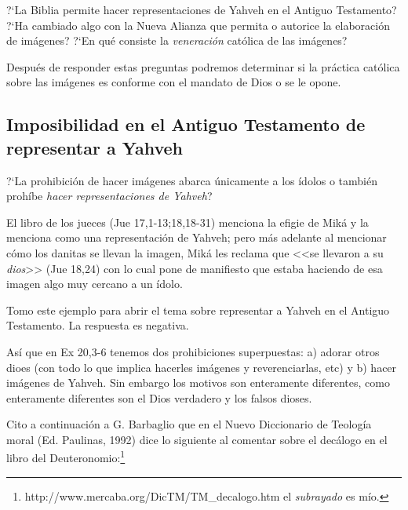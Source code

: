 ?`La Biblia permite hacer representaciones de Yahveh en el Antiguo Testamento? ?`Ha cambiado algo con la Nueva Alianza que permita o autorice la elaboraci\'on de im\'agenes? ?`En qu\'e consiste la \emph{veneraci\'on} cat\'olica de las im\'agenes?

Despu\'es de responder estas preguntas podremos determinar si la pr\'actica cat\'olica sobre las im\'agenes es conforme con el mandato de Dios o se le opone.

\subsection{Imposibilidad en el Antiguo Testamento de representar a Yahveh}

?`La prohibici\'on de hacer im\'agenes abarca \'unicamente a los \'{i}dolos o tambi\'en proh\'{i}be \emph{hacer representaciones de Yahveh}?

El libro de los jueces (Jue 17,1-13;18,18-31) menciona la efigie de Mik\'a y la menciona como una representaci\'on de Yahveh; pero m\'as adelante al mencionar c\'omo los danitas se llevan la imagen, Mik\'a les reclama que <<se llevaron a su \emph{dios}>> (Jue 18,24) con lo cual pone de manifiesto que estaba haciendo de esa imagen algo muy cercano a un \'{i}dolo.

Tomo este ejemplo para abrir el tema sobre representar a Yahveh en el Antiguo Testamento. La respuesta es negativa.

As\'{i} que en Ex 20,3-6 tenemos dos prohibiciones superpuestas: a) adorar otros dioes (con todo lo que implica hacerles im\'agenes y reverenciarlas, etc) y b) hacer im\'agenes de Yahveh. Sin embargo los motivos son enteramente diferentes, como enteramente diferentes son el Dios verdadero y los falsos dioses.

Cito a continuaci\'on a G. Barbaglio que en el Nuevo Diccionario de Teolog\'{i}a moral (Ed. Paulinas, 1992) dice lo siguiente al comentar sobre el dec\'alogo en el libro del Deuteronomio:\footnote{http://www.mercaba.org/DicTM/TM\_decalogo.htm el \emph{subrayado} es m\'{i}o.}


